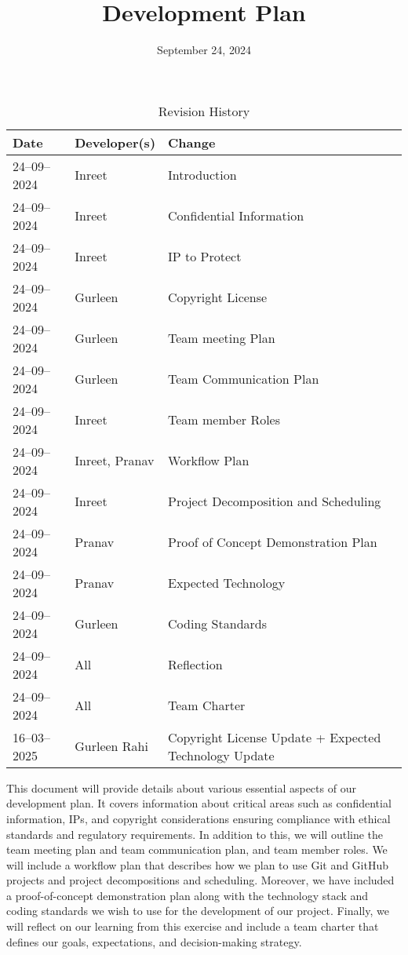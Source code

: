 \documentclass{article}
\title{Development Plan\\\progname}
\author{\authname}
\date{September 24, 2024}
\begin{document}
\maketitle

\begin{table}[hp]
\caption{Revision History} \label{TblRevisionHistory}
\begin{tabularx}{\textwidth}{llX}
\toprule
\textbf{Date} & \textbf{Developer(s)} & \textbf{Change}\\
\midrule
24--09--2024 & Inreet & Introduction\\
24--09--2024 & Inreet & Confidential Information\\
24--09--2024 & Inreet & IP to Protect\\
24--09--2024 & Gurleen & Copyright License\\
24--09--2024 & Gurleen & Team meeting Plan\\
24--09--2024 & Gurleen & Team Communication Plan\\
24--09--2024 & Inreet & Team member Roles\\
24--09--2024 & Inreet, Pranav & Workflow Plan\\
24--09--2024 & Inreet & Project Decomposition and Scheduling\\
24--09--2024 & Pranav & Proof of Concept Demonstration Plan\\
24--09--2024 & Pranav & Expected Technology\\
24--09--2024 & Gurleen & Coding Standards\\
24--09--2024 & All & Reflection\\
24--09--2024 & All & Team Charter\\
16--03--2025 & Gurleen Rahi & Copyright License Update + Expected Technology Update\\
\bottomrule
\end{tabularx}
\end{table}

\newpage{}

This document will provide details about various essential aspects of our development plan. It covers information about critical areas such as confidential information, IPs, and copyright considerations ensuring compliance with ethical standards and regulatory requirements. In addition to this, we will outline the team meeting plan and team communication plan, and team member roles. We will include a workflow plan that describes how we plan to use Git and GitHub projects and project decompositions and scheduling. Moreover, we have included a proof-of-concept demonstration plan along with the technology stack and coding standards we wish to use for the development of our project. Finally, we will reflect on our learning from this exercise and include a team charter that defines our goals, expectations, and decision-making strategy.
\end{document}

